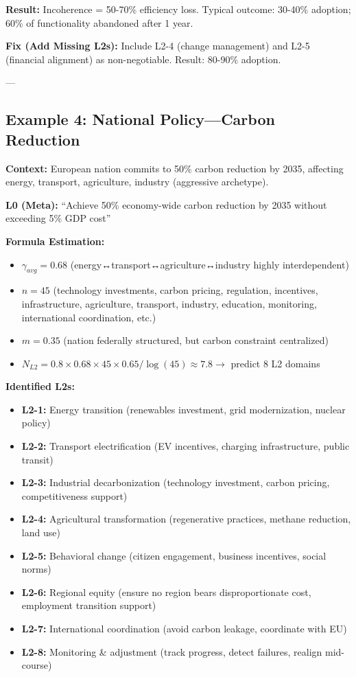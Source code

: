 \documentclass[11pt, a4paper]{article}
\begin{document}
\textbf{Result:} Incoherence = 50-70\% efficiency loss. Typical outcome: 30-40\% adoption; 60\% of functionality abandoned after 1 year.

\textbf{Fix (Add Missing L2s):} Include L2-4 (change management) and L2-5 (financial alignment) as non-negotiable. Result: 80-90\% adoption.

---

\subsection{Example 4: National Policy---Carbon Reduction} \label{sec:ch15-part4e}

\textbf{Context:} European nation commits to 50\% carbon reduction by 2035, affecting energy, transport, agriculture, industry (aggressive archetype).

\textbf{L0 (Meta):} ``Achieve 50\% economy-wide carbon reduction by 2035 without exceeding 5\% GDP cost''

\textbf{Formula Estimation:}
\begin{itemize}[nosep]
    \item $\gamma_{avg} = 0.68$ (energy↔transport↔agriculture↔industry highly interdependent)
    \item $n = 45$ (technology investments, carbon pricing, regulation, incentives, infrastructure, agriculture, transport, industry, education, monitoring, international coordination, etc.)
    \item $m = 0.35$ (nation federally structured, but carbon constraint centralized)
    \item $N_{L2} = 0.8 \times 0.68 \times 45 \times 0.65 / \log(45) \approx 7.8 \rightarrow$ predict 8 L2 domains
\end{itemize}

\textbf{Identified L2s:}
\begin{itemize}[nosep]
    \item \textbf{L2-1:} Energy transition (renewables investment, grid modernization, nuclear policy)
    \item \textbf{L2-2:} Transport electrification (EV incentives, charging infrastructure, public transit)
    \item \textbf{L2-3:} Industrial decarbonization (technology investment, carbon pricing, competitiveness support)
    \item \textbf{L2-4:} Agricultural transformation (regenerative practices, methane reduction, land use)
    \item \textbf{L2-5:} Behavioral change (citizen engagement, business incentives, social norms)
    \item \textbf{L2-6:} Regional equity (ensure no region bears disproportionate cost, employment transition support)
    \item \textbf{L2-7:} International coordination (avoid carbon leakage, coordinate with EU)
    \item \textbf{L2-8:} Monitoring \& adjustment (track progress, detect failures, realign mid-course)
\end{itemize}
\end{document}
